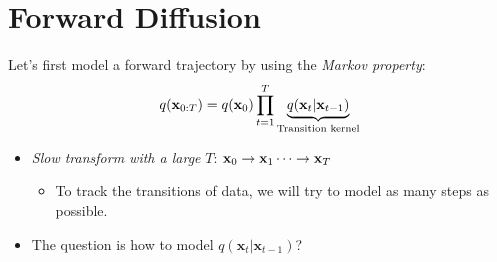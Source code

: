 \section{Forward Diffusion}
Let's first model a forward trajectory by using the \textit{Markov property}: 
$$q(\mathbf{x}_{0:T}) = q({\mathbf{x}}_0)\prod^T_{t=1} \underbrace{q(\mathbf{x}_t \vert \mathbf{x}_{t-1})}_{\text{Transition kernel}} $$
\begin{itemize}
	\item \textit{Slow transform with a large} $T$: ${\mathbf{x}}_0\to {\mathbf{x}}_1\cdots\to {\mathbf{x}}_T$
		\begin{itemize}
			\item To track the transitions of data, we will try to model as many steps as possible.
		\end{itemize}
	\item The question is how to model $q(\mathbf{x}_t \vert \mathbf{x}_{t-1})$?
\end{itemize}

